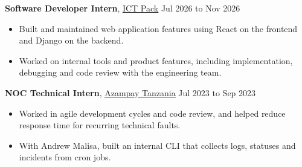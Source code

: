 \documentclass[12pt]{article}
\newcommand{\hlink}[2]{\href{#1}{\textcolor{linkblue}{\underline{#2}}}}
\begin{document}
\vspace{18pt}
\textbf{Software Developer Intern}, \hlink{https://ictpack.com}{ICT Pack} \hfill Jul 2026 to Nov 2026\\
\begin{itemize}
  \item Built and maintained web application features using React on the frontend and Django on the backend.
  \item Worked on internal tools and product features, including implementation, debugging and code review with the engineering team.
\end{itemize}

\vspace{18pt}
\textbf{NOC Technical Intern}, \hlink{https://azampay.com/}{Azampay Tanzania} \hfill Jul 2023 to Sep 2023\\
\begin{itemize}
  \item Worked in agile development cycles and code review, and helped reduce response time for recurring technical faults.
  \item With Andrew Malisa, built an internal CLI that collects logs, statuses and incidents from cron jobs.
\end{itemize}
\end{document}
